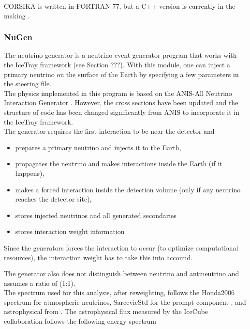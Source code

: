 \noindent CORSIKA  is written in FORTRAN 77, but a C++ version is currently in the making \cite{Engel:2018akg}.
\subsubsection{NuGen}
The neutrino-generator  is a neutrino event generator program that works with the IceTray framework (see Section ???). With this module, one can inject a primary neutrino on the surface of the Earth by specifying a few parameters in the steering file.\\

\noindent The physics implemented in this program is based on the ANIS-All Neutrino Interaction Generator \cite{Gazizov:2004va}. However, the cross sections have been updated and the structure of code has been changed significantly from ANIS to incorporate it in the IceTray framework.\\

\noindent The generator requires the first interaction to be near the detector and

\begin{itemize}
\item prepares a primary neutrino and injects it to the Earth,
\item propagates the neutrino and makes interactions inside the Earth (if it happens),
\item makes a forced interaction inside the detection volume (only if any neutrino reaches the detector site),
\item stores injected neutrinos and all generated secondaries
\item stores interaction weight information
\end{itemize}
\vspace{3mm}
\noindent Since the generators forces the interaction to occur (to optimize computational resources), the interaction weight has to take this into accound.

The generator also does not distinguish between neutrino and antineutrino and assumes  a ratio of (1:1).\\

\noindent The spectrum used for this analysis, after reweighting, follows the Honda2006 spectrum \cite{Honda:2006qj} for atmospheric neutrinos, SarcevicStd for the prompt component \cite{Enberg:2008te}, and astrophysical from \cite{Aartsen:2014gkd}. The astrophysical flux measured by the IceCube collaboration follows the following energy spectrum

